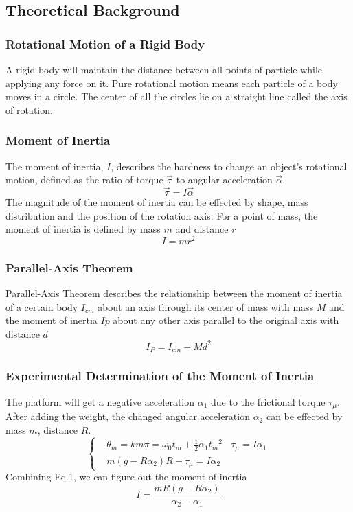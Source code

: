 \documentclass[12pt,a4paper]{article}
\begin{document}
\subsection{Theoretical Background}

\subsubsection{Rotational Motion of a Rigid Body}
A rigid body will maintain the distance between all points of particle while applying any force on it. Pure rotational motion means each particle of a body moves in a circle. The center of all the circles lie on a straight line called the axis of rotation.

\subsubsection{Moment of Inertia}
The moment of inertia, $I$, describes the hardness to change an object's rotational motion, defined as the ratio of torque $\vec{\tau}$ to angular acceleration $\vec{\alpha}$. $$\vec{\tau}=I\vec{\alpha}$$ The magnitude of the moment of inertia can be effected by shape, mass distribution and the position of the rotation axis. For a point of mass, the moment of inertia is defined by mass $m$ and distance $r$ $$I=mr^2$$ 

\subsubsection{Parallel-Axis Theorem}
Parallel-Axis Theorem describes the relationship between the moment of inertia of a certain body $I_{cm}$ about an axis through its center of mass with mass $M$ and the moment of inertia $Ip$ about any other axis parallel to the original axis with distance $d$
$$ I_P=I_{cm}+Md^2 $$

\subsubsection{Experimental Determination of the Moment of Inertia}
The platform will get a negative acceleration $\alpha_1$ due to the frictional torque $\tau_\mu$. 
After adding the weight, the changed angular acceleration $\alpha_2$ can be effected by mass $m$, distance $R$.
\begin{equation}
    \left\{
        \begin{aligned}
            & \theta_m=km\pi=\omega_0t_m+\frac{1}{2}\alpha_1{t_m}^2
            ~~~~\tau_\mu=I\alpha_1 \\
            & m(g-R\alpha_2)R-\tau_\mu=I\alpha_2
        \end{aligned}
    \right.
\end{equation}
Combining Eq.1, we can figure out the moment of inertia
\begin{equation} 
    I=\frac{mR(g-R\alpha_2)}{\alpha_2-\alpha_1}
\end{equation}
\end{document}
